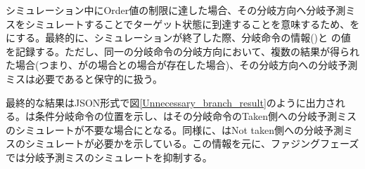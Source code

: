シミュレーション中にOrder値の制限に達した場合、その分岐方向へ分岐予測ミスをシミュレートすることでターゲット状態に到達することを意味するため、をにする。最終的に、シミュレーションが終了した際、分岐命令の情報()と の値を記録する。ただし、同一の分岐命令の分岐方向において、複数の結果が得られた場合(つまり、がの場合との場合が存在した場合)、その分岐方向への分岐予測ミスは必要であると保守的に扱う。\par

最終的な結果はJSON形式で図\ref{Unnecessary_branch_result}のように出力される。は条件分岐命令の位置を示し、はその分岐命令のTaken側への分岐予測ミスのシミュレートが不要な場合にとなる。同様に、はNot taken側への分岐予測ミスのシミュレートが必要かを示している。この情報を元に、ファジングフェーズでは分岐予測ミスのシミュレートを抑制する。\par


